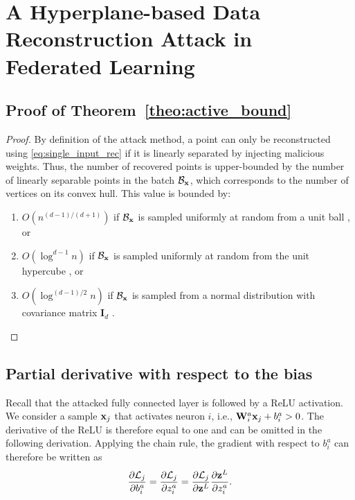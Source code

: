 \chapter{A Hyperplane-based Data Reconstruction Attack in Federated Learning}

\section{Proof of Theorem~\ref{theo:active_bound}}
\label{sec:proof_convex_hull}
\begin{proof}
By definition of the attack method, a point can only be reconstructed using \eqref{eq:single_input_rec} if it is linearly separated by injecting malicious weights.
Thus, the number of recovered points is upper-bounded by the number of linearly separable points in the batch $\mathcal{B}_{{\mathbf{x}}}$,  which corresponds to the number of vertices on %
its convex hull.
This value is bounded by:
\begin{enumerate}
    \item $O(n^{(d-1)/(d+1)})$ if $\mathcal{B}_{{\mathbf{x}}}$ is sampled uniformly at random from a unit ball \cite{Raynaud_1970}, or
    \item $O(\log^{d-1} n)$ if $\mathcal{B}_{{\mathbf{x}}}$ is sampled uniformly at random from the unit hypercube \cite{BentleyKST78}, or
    \item $O(\log^{(d-1)/2} n)$ if $\mathcal{B}_{{\mathbf{x}}}$ is sampled from a normal distribution with covariance matrix $\mathbf{I}_d$ \cite{Raynaud_1970}.
\end{enumerate}
\end{proof}


\section{Partial derivative with respect to the bias}
\label{app:partial_derivative}
Recall that the attacked fully connected layer is followed by a ReLU activation. We consider a sample ${\mathbf{x}}_j$ that activates neuron $i$, i.e., $\mathbf{W}_i^a{\mathbf{x}}_j+b_i^a>0$. The derivative of the ReLU is therefore equal to one and can be omitted in the following derivation. Applying the chain rule, the gradient with respect to $b_i^a$ can therefore be written as\begin{equation}
\label{eq:chain_rule}
    \frac{\partial{\ensuremath{\mathcal{L}}_j}}{\partial{b^{a}_i}} = \frac{\partial{\ensuremath{\mathcal{L}}_j}}{\partial{z^{a}_i}} = \frac{\partial{\ensuremath{\mathcal{L}}_j}}{\partial{{\mathbf{z}}^{L}}} \frac{\partial{{\mathbf{z}}^{L}}}{\partial{z_i^{a}}}.
\end{equation}


